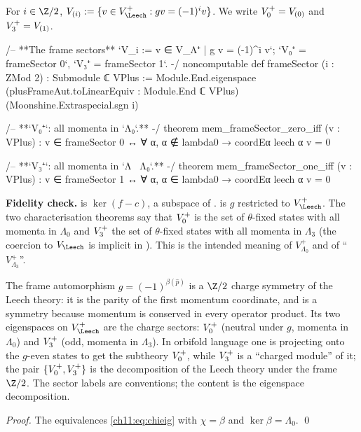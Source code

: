 \begin{definition}\label{ch11:def:framesector}
For $i\in\Z/2$, $V_{(i)}:=\{v\in V_\Leech^+ : g v=(-1)^i v\}$.  We write $V_0^{+}=V_{(0)}$ and
$V_3^{+}=V_{(1)}$.
\end{definition}
\begin{leancode}
/-- **The frame sectors** `V_i := {v ∈ V_Λ⁺ | g v = (-1)^i v}`; `V₀⁺ = frameSector 0`,
`V₃⁺ = frameSector 1`. -/
noncomputable def frameSector (i : ZMod 2) : Submodule ℂ VPlus :=
  Module.End.eigenspace (plusFrameAut.toLinearEquiv : Module.End ℂ VPlus)
    (Moonshine.Extraspecial.sgn i)

/-- **`V₀⁺`: all momenta in `Λ₀`.** -/
theorem mem_frameSector_zero_iff (v : VPlus) :
    v ∈ frameSector 0 ↔ ∀ α, α ∉ lambda0 → coordEα leech α v = 0

/-- **`V₃⁺`: all momenta in `Λ \ Λ₀`.** -/
theorem mem_frameSector_one_iff (v : VPlus) :
    v ∈ frameSector 1 ↔ ∀ α, α ∈ lambda0 → coordEα leech α v = 0
\end{leancode}
\begin{dictionary}
\textbf{Fidelity check.}   is $\ker(f-c)$, a subspace of
.   is $g$ restricted to $V_\Leech^+$.  The two
characterisation theorems say that $V_0^{+}$ is the set of $\theta$-fixed states with all momenta
in $\Lambda_0$ and $V_3^{+}$ the set of $\theta$-fixed states with all momenta in $\Lambda_3$
(the coercion  to $V_\Leech$ is implicit in ).  This is the
intended meaning of $V_{\Lambda_0}^+$ and of ``$V_{\Lambda_3}^+$''.
\end{dictionary}

\begin{physics}
The frame automorphism $g=(-1)^{\beta(\hat p)}$ is a $\Z/2$ charge symmetry of the Leech theory: it is the parity of the first momentum coordinate, and is a symmetry because momentum is conserved in every operator product. Its two eigenspaces on $V_\Leech^+$ are the charge sectors: $V_0^{+}$ (neutral under $g$, momenta in $\Lambda_0$) and $V_3^{+}$ (odd, momenta in $\Lambda_3$). In orbifold language one is projecting onto the $g$-even states to get the subtheory $V_0^{+}$, while $V_3^{+}$ is a ``charged module'' of it; the pair $\{V_0^{+},V_3^{+}\}$ is the decomposition of the Leech theory under the frame $\Z/2$. The sector labels are conventions; the content is the eigenspace decomposition.
\end{physics}
\emph{Proof.}  The equivalences \eqref{ch11:eq:chieig} with $\chi=\beta$ and $\ker\beta=\Lambda_0$. \qed


